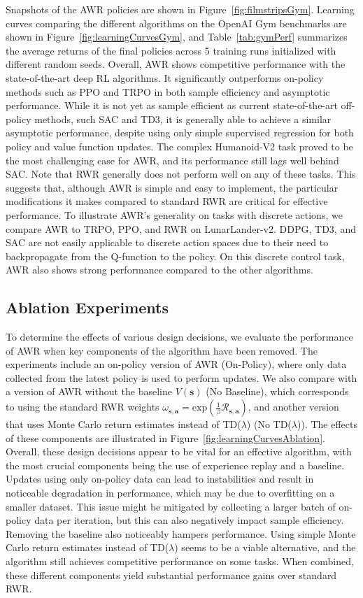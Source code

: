 \documentclass{article} \usepackage{iclr2020_conference,times}
\def\rva{{\mathbf{a}}}
\def\rvs{{\mathbf{s}}}
\begin{document}
Snapshots of the AWR policies are shown in Figure~\ref{fig:filmstripsGym}. Learning curves comparing the different algorithms on the OpenAI Gym benchmarks are shown in Figure~\ref{fig:learningCurvesGym}, and Table~\ref{tab:gymPerf} summarizes the average returns of the final policies across 5 training runs initialized with different random seeds. Overall, AWR shows competitive performance with the state-of-the-art deep RL algorithms. It significantly outperforms on-policy methods such as PPO and TRPO in both sample efficiency and asymptotic performance. While it is not yet as sample efficient as current state-of-the-art off-policy methods, such SAC and TD3, it is generally able to achieve a similar asymptotic performance, despite using only simple supervised regression for both policy and value function updates. The complex Humanoid-V2 task proved to be the most challenging case for AWR, and its performance still lags well behind SAC. Note that RWR generally does not perform well on any of these tasks. This suggests that, although AWR is simple and easy to implement, the particular modifications it makes compared to standard RWR are critical for effective performance.
To illustrate AWR's generality on tasks with discrete actions, we compare AWR to TRPO, PPO, and RWR on LunarLander-v2. DDPG, TD3, and SAC are not easily applicable to discrete action spaces due to their need to backpropagate from the Q-function to the policy.
On this discrete control task, AWR also shows strong performance compared to the other algorithms.

\subsection{Ablation Experiments}
To determine the effects of various design decisions, we evaluate the performance of AWR when key components of the algorithm have been removed. The experiments include an on-policy version of AWR (On-Policy), where only data collected from the latest policy is used to perform updates. We also compare with a version of AWR without the baseline $V(\rvs)$ (No Baseline), which corresponds to using the standard RWR weights ${\omega_{\rvs, \rva} = \mathrm{exp}(\frac{1}{\beta}\mathcal{R}_{\rvs, \rva})}$, and another version that uses Monte Carlo return estimates instead of TD($\lambda$) (No TD($\lambda$)). The effects of these components are illustrated in Figure~\ref{fig:learningCurvesAblation}. Overall, these design decisions appear to be vital for an effective algorithm, with the most crucial components being the use of experience replay and a baseline. Updates using only on-policy data can lead to instabilities and result in noticeable degradation in performance, which may be due to overfitting on a smaller dataset. This issue might be mitigated by collecting a larger batch of on-policy data per iteration, but this can also negatively impact sample efficiency. Removing the baseline also noticeably hampers performance. Using simple Monte Carlo return estimates instead of TD($\lambda$) seems to be a viable alternative, and the algorithm still achieves competitive performance on some tasks. When combined, these different components yield substantial performance gains over standard RWR.
\end{document}
